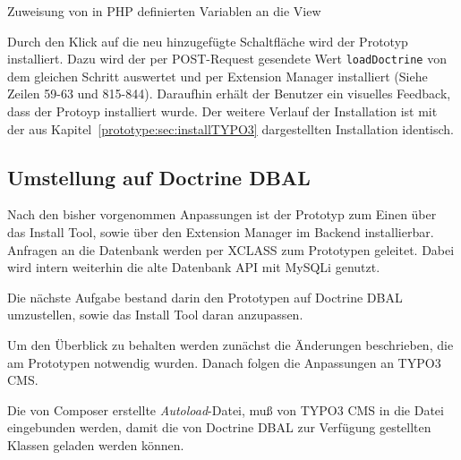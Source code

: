 {\begin{listing}
\caption{Zuweisung von in PHP definierten Variablen an die View}
\end{listing}

Durch den Klick auf die neu hinzugefügte Schaltfläche wird der Prototyp installiert. Dazu wird der per POST-Request gesendete Wert \texttt{loadDoctrine} von dem gleichen Schritt auswertet und per Extension Manager installiert (Siehe  Zeilen 59-63 und 815-844). Daraufhin erhält der Benutzer ein visuelles Feedback, dass der Protoyp installiert wurde. Der weitere Verlauf der Installation ist mit der aus Kapitel~\ref{prototype:sec:installTYPO3} dargestellten Installation identisch.

\subsection{Umstellung auf Doctrine DBAL}
Nach den bisher vorgenommen Anpassungen ist der Prototyp zum Einen über das Install Tool, sowie über den Extension Manager im Backend installierbar. Anfragen an die Datenbank werden per XCLASS zum Prototypen geleitet. Dabei wird intern weiterhin die alte Datenbank API mit MySQLi genutzt.

Die nächste Aufgabe bestand darin den Prototypen auf Doctrine DBAL umzustellen, sowie das Install Tool daran anzupassen.

Um den Überblick zu behalten werden zunächst die Änderungen beschrieben, die am Prototypen notwendig wurden. Danach folgen die Anpassungen an TYPO3 CMS.

Die von Composer erstellte \textit{Autoload}-Datei, muß von TYPO3 CMS in die Datei  eingebunden werden, damit die von Doctrine DBAL zur Verfügung gestellten Klassen geladen werden können.

}
